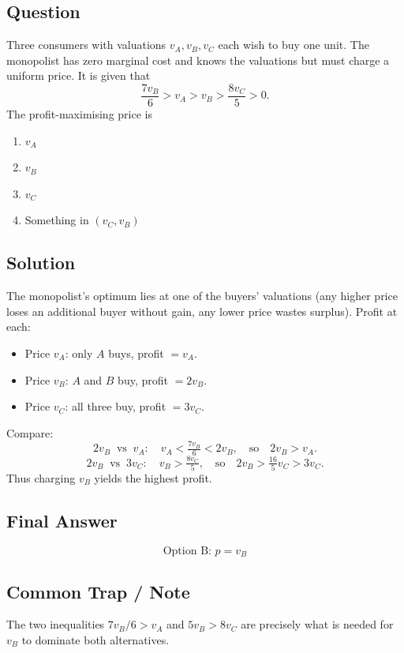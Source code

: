 \documentclass[11pt]{article}
\begin{document}
\subsection*{Question}
Three consumers with valuations $v_A, v_B, v_C$ each wish to buy one unit. The
monopolist has zero marginal cost and knows the valuations but must charge a
uniform price. It is given that
\[
\frac{7 v_B}{6} > v_A > v_B > \frac{8 v_C}{5} > 0.
\]
The profit-maximising price is
\begin{enumerate}[label=(\Alph*)]
\item $v_A$ \item $v_B$ \item $v_C$ \item Something in $(v_C, v_B)$
\end{enumerate}

\subsection*{Solution}
The monopolist's optimum lies at one of the buyers' valuations (any higher price
loses an additional buyer without gain, any lower price wastes surplus). Profit at each:
\begin{itemize}
\item Price $v_A$: only $A$ buys, profit $= v_A$.
\item Price $v_B$: $A$ and $B$ buy, profit $= 2 v_B$.
\item Price $v_C$: all three buy, profit $= 3 v_C$.
\end{itemize}
Compare:
\[
2 v_B \;\;\text{vs}\;\; v_A: \quad v_A < \tfrac{7 v_B}{6} < 2 v_B,
\quad\text{so}\quad 2 v_B > v_A.
\]
\[
2 v_B \;\;\text{vs}\;\; 3 v_C: \quad v_B > \tfrac{8 v_C}{5},
\quad\text{so}\quad 2 v_B > \tfrac{16}{5} v_C > 3 v_C.
\]
Thus charging $v_B$ yields the highest profit.

\subsection*{Final Answer}
\[
\boxed{\text{Option B: } p = v_B}
\]

\subsection*{Common Trap / Note}
The two inequalities $7v_B/6 > v_A$ and $5 v_B > 8 v_C$ are precisely what is
needed for $v_B$ to dominate both alternatives.

\end{document}
